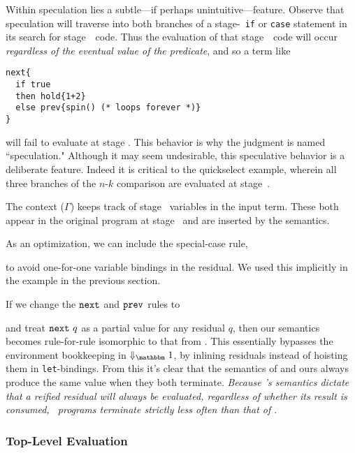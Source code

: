 Within speculation lies a subtle---if perhaps unintuitive---feature.  
Observe that speculation will traverse into both branches of a stage-\bbtwo\ {\tt if} or {\tt case} 
statement in its search for stage~\bbone\ code. 
Thus the evaluation of that stage~\bbone\ code will occur {\em regardless of the eventual value of the predicate},
and so a term like 
\begin{lstlisting} 
next{
  if true 
  then hold{1+2} 
  else prev{spin() (* loops forever *)}
}
\end{lstlisting}
will fail to evaluate at stage \bbone.
This behavior is why the judgment is named ``speculation."
Although it may seem undesirable, this speculative behavior is a deliberate feature.
Indeed it is critical to the quickselect example, 
wherein all three branches of the $n$-$k$ comparison are evaluated at stage~\bbone.

The context ($\Gamma$) keeps track of stage \bbtwo\ variables in the input term. 
These both appear in the original program at stage \bbtwo\ and are inserted by the semantics.

As an optimization, we can include the special-case rule,
\begin{mathpar}
\end{mathpar}
to avoid one-for-one variable bindings in the residual.
We used this implicitly in the example in the previous section.


If we change the $\next$ and $\prev$ rules to 
and treat $\next~q$ as a partial value for any residual $q$,
then our semantics becomes rule-for-rule isomorphic to that from \cite{davies96}. This essentially bypasses the
environment bookkeeping in $\redonesym$, by inlining residuals instead of
hoisting them in \verb|let|-bindings.
From this it's clear that the semantics of \cite{davies96} and ours always produce the same value when they both terminate.
{\em Because \lang's semantics dictate that a reified residual will always be evaluated, regardless of whether its result is consumed, \lang\ programs terminate strictly less often than that of \cite{davies96}}.

\subsubsection {Top-Level Evaluation}
\label{sec:partialeval}

